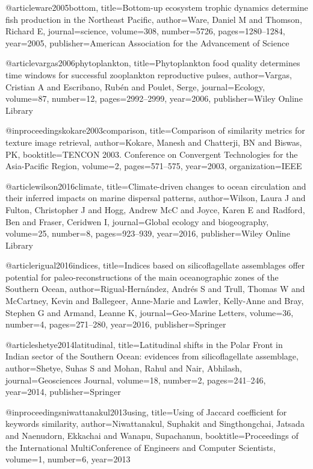 {{{{{{{{{@article{ware2005bottom,
  title={Bottom-up ecosystem trophic dynamics determine fish production in the Northeast Pacific},
  author={Ware, Daniel M and Thomson, Richard E},
  journal={science},
  volume={308},
  number={5726},
  pages={1280--1284},
  year={2005},
  publisher={American Association for the Advancement of Science}
}


@article{vargas2006phytoplankton,
  title={Phytoplankton food quality determines time windows for successful zooplankton reproductive pulses},
  author={Vargas, Cristian A and Escribano, Rub{\'e}n and Poulet, Serge},
  journal={Ecology},
  volume={87},
  number={12},
  pages={2992--2999},
  year={2006},
  publisher={Wiley Online Library}
}

@inproceedings{kokare2003comparison,
  title={Comparison of similarity metrics for texture image retrieval},
  author={Kokare, Manesh and Chatterji, BN and Biswas, PK},
  booktitle={TENCON 2003. Conference on Convergent Technologies for the Asia-Pacific Region},
  volume={2},
  pages={571--575},
  year={2003},
  organization={IEEE}
}

@article{wilson2016climate,
  title={Climate-driven changes to ocean circulation and their inferred impacts on marine dispersal patterns},
  author={Wilson, Laura J and Fulton, Christopher J and Hogg, Andrew McC and Joyce, Karen E and Radford, Ben and Fraser, Ceridwen I},
  journal={Global ecology and biogeography},
  volume={25},
  number={8},
  pages={923--939},
  year={2016},
  publisher={Wiley Online Library}
}

@article{rigual2016indices,
  title={Indices based on silicoflagellate assemblages offer potential for paleo-reconstructions of the main oceanographic zones of the Southern Ocean},
  author={Rigual-Hern{\'a}ndez, Andr{\'e}s S and Trull, Thomas W and McCartney, Kevin and Ballegeer, Anne-Marie and Lawler, Kelly-Anne and Bray, Stephen G and Armand, Leanne K},
  journal={Geo-Marine Letters},
  volume={36},
  number={4},
  pages={271--280},
  year={2016},
  publisher={Springer}
}

@article{shetye2014latitudinal,
  title={Latitudinal shifts in the Polar Front in Indian sector of the Southern Ocean: evidences from silicoflagellate assemblage},
  author={Shetye, Suhas S and Mohan, Rahul and Nair, Abhilash},
  journal={Geosciences Journal},
  volume={18},
  number={2},
  pages={241--246},
  year={2014},
  publisher={Springer}
}

@inproceedings{niwattanakul2013using,
  title={Using of Jaccard coefficient for keywords similarity},
  author={Niwattanakul, Suphakit and Singthongchai, Jatsada and Naenudorn, Ekkachai and Wanapu, Supachanun},
  booktitle={Proceedings of the International MultiConference of Engineers and Computer Scientists},
  volume={1},
  number={6},
  year={2013}
}

}}}}}}}}}
